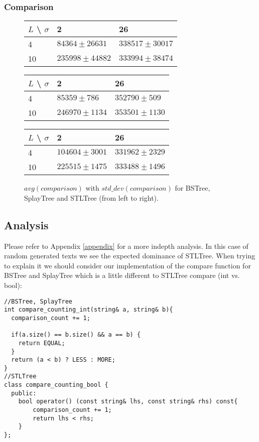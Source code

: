 \documentclass[12pt,a4paper]{article}
\begin{document}
\subsubsection{Comparison} 

\begin{figure}[h]
  \centering
  \begin{tabular}{|l|l|l|}
    \hline
    $L$ \textbackslash{} $\sigma$ & 2 & 26 \\
    \hline
    4  & $84364 \pm 26631$ & $338517 \pm 30017$ \\
    \hline
    10 & $235998 \pm 44882$ & $333994 \pm 38474$ \\
    \hline
  \end{tabular}
  \begin{tabular}{|l|l|l|}
    \hline
    $L$ \textbackslash{} $\sigma$ & 2 & 26 \\
    \hline
    4  & $85359 \pm 786$ & $352790 \pm 509$ \\
    \hline
    10 & $246970 \pm 1134$ & $353501 \pm 1130$ \\
    \hline
  \end{tabular}
  \begin{tabular}{|l|l|l|}
    \hline
    $L$ \textbackslash{} $\sigma$ & 2 & 26 \\
    \hline
    4  & $104604 \pm 3001$ & $331962 \pm 2329$ \\
    \hline
    10 & $225515 \pm 1475$ & $333488 \pm 1496$ \\
    \hline
  \end{tabular}
  \caption{$avg(comparison)$ with $std\_dev(comparison)$ for BSTree, SplayTree and STLTree (from left to right).}
  \label{fig:avg_std_comparison}
\end{figure}

\subsection{Analysis} 
Please refer to Appendix \ref{appendix} for a more indepth analysis. In this case of random generated texts we see the expected dominance of STLTree. When trying to explain it we should consider our implementation of the compare function for BSTree and SplayTree which is a little different to STLTree compare (int vs. bool): 

\begin{lstlisting} 
//BSTree, SplayTree
int compare_counting_int(string& a, string& b){ 
  comparison_count += 1; 
  
  if(a.size() == b.size() && a == b) {
    return EQUAL; 
  }
  return (a < b) ? LESS : MORE; 
}
//STLTree
class compare_counting_bool {
  public: 
    bool operator() (const string& lhs, const string& rhs) const{
        comparison_count += 1; 
        return lhs < rhs;
    }
};
\end{lstlisting}
\end{document}
